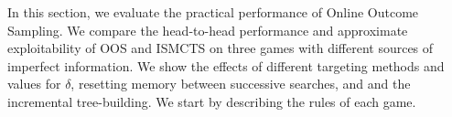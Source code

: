 \documentclass[letterpaper]{article}
\newcommand{\tth}{\mathtt{h}}
\begin{document}
%

In this section, we evaluate the practical performance of Online Outcome Sampling. We compare the head-to-head performance and approximate exploitability 
of OOS and ISMCTS on three games with different sources of imperfect information. We show the effects of 
different targeting methods and values for $\delta$, resetting memory between successive searches, and
and the incremental tree-building. We start by describing the rules of each game. 
\end{document}
